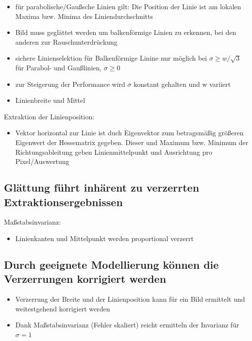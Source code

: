 \documentclass[11pt]{article}
\begin{document}
\begin{itemize}
\begin{itemize}
                \item für parabolische/Gaußsche Linien gilt: Die Position der Linie ist am lokalen Maxima bzw. Minima des Liniendurchschnitts
                \item Bild muss geglättet werden um balkenförmige Linien zu erkennen, bei den anderen zur Rauschunterdrückung
                \item sichere Linienselektion für Balkenförmige Linine nur möglich bei $\sigma \geq w / \sqrt{3}$ für Parabol- und Gaußlinien, $\sigma \geq 0$
                \item zur Steigerung der Performance wird $\sigma$ konstant gehalten und w variiert
                \item Linienbreite und Mittel
            \end{itemize}
        \end{itemize}
    Extraktion der Linienposition:
    \begin{itemize}
        \item Vektor horizontal zur Linie ist duch Eigenvektor zum betragsmäßig größeren Eigenwert der
            Hessematrix gegeben. Dieser und Maximum bzw. Minimum der Richtungsableitung geben Linienmittelpunkt und Ausrichtung pro Pixel/Auswertung
    \end{itemize}

\subsection{Glättung führt inhärent zu verzerrten Extraktionsergebnissen}
    Maßstabsinvarianz:
        \begin{itemize}
            \item Linienkanten und Mittelpunkt werden proportional verzerrt
            \end{itemize}

\subsection{Durch geeignete Modellierung können die Verzerrungen korrigiert werden}
            \begin{itemize}
            \item Verzerrung der Breite und der Linienposition kann für ein Bild ermittelt und weitestgehend korrigiert werden
            \item Dank Maßstabsinvarianz (Fehler skaliert) reicht ermitteln der Invarianz für $\sigma = 1$
        \end{itemize}
\end{document}
